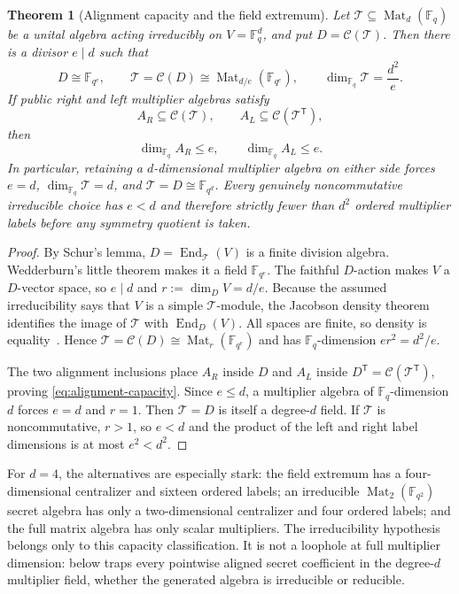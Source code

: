 \documentclass[11pt]{article}
\newtheorem{theorem}{Theorem}[section]
\newcommand{\F}{\mathbb F}
\newcommand{\Mat}{\operatorname{Mat}}
\newcommand{\transpose}{\mathsf T}
\begin{document}
\begin{theorem}[Alignment capacity and the field extremum]
\label{thm:alignment-capacity}
Let $\mathcal T\subseteq\Mat_d(\F_q)$ be a unital algebra acting
irreducibly on $V=\F_q^d$, and put $D=\mathcal C(\mathcal T)$.  Then there
is a divisor $e\mid d$ such that
\begin{equation}
 D\cong\F_{q^e},
 \qquad
 \mathcal T=\mathcal C(D)\cong
       \Mat_{d/e}(\F_{q^e}),
 \qquad
 \dim_{\F_q}\mathcal T=\frac{d^2}{e}.          \label{eq:double-centralizer-shape}
\end{equation}
If public right and left multiplier algebras satisfy
\[
 A_R\subseteq\mathcal C(\mathcal T),
 \qquad
 A_L\subseteq\mathcal C(\mathcal T^\transpose),
\]
then
\begin{equation}
 \dim_{\F_q}A_R\le e,
 \qquad
 \dim_{\F_q}A_L\le e.                         \label{eq:alignment-capacity}
\end{equation}
In particular, retaining a $d$-dimensional multiplier algebra on either side
forces $e=d$, $\dim_{\F_q}\mathcal T=d$, and
$\mathcal T=D\cong\F_{q^d}$.  Every genuinely noncommutative irreducible
choice has $e<d$ and therefore strictly fewer than $d^2$ ordered multiplier
labels before any symmetry quotient is taken.
\end{theorem}

\begin{proof}
By Schur's lemma, $D=\operatorname{End}_{\mathcal T}(V)$ is a finite
division algebra.  Wedderburn's little theorem makes it a field
$\F_{q^e}$.  The faithful $D$-action makes $V$ a $D$-vector space, so
$e\mid d$ and $r:=\dim_DV=d/e$.  Because the assumed irreducibility says
that $V$ is a simple $\mathcal T$-module, the Jacobson density theorem
identifies the image of $\mathcal T$ with $\operatorname{End}_D(V)$.
All spaces are finite, so density is equality~\cite{Jacobson1989BasicAlgebraII}.
Hence
$\mathcal T=\mathcal C(D)\cong\Mat_r(\F_{q^e})$ and has
$\F_q$-dimension $er^2=d^2/e$.

The two alignment inclusions place $A_R$ inside $D$ and $A_L$ inside
$D^\transpose=\mathcal C(\mathcal T^\transpose)$, proving
\eqref{eq:alignment-capacity}.  Since $e\le d$, a multiplier algebra of
$\F_q$-dimension $d$ forces $e=d$ and $r=1$.  Then
$\mathcal T=D$ is itself a degree-$d$ field.  If $\mathcal T$ is
noncommutative, $r>1$, so $e<d$ and the product of the left and right label
dimensions is at most $e^2<d^2$.
\end{proof}

For $d=4$, the alternatives are especially stark: the field extremum has a
four-dimensional centralizer and sixteen ordered labels; an irreducible
$\Mat_2(\F_{q^2})$ secret algebra has only a two-dimensional centralizer
and four ordered labels; and the full matrix algebra has only scalar
multipliers.  The irreducibility hypothesis belongs only to this capacity
classification.  It is not a loophole at full multiplier dimension:
 below traps every pointwise aligned
secret coefficient in the degree-$d$ multiplier field, whether the generated
algebra is irreducible or reducible.
\end{document}
